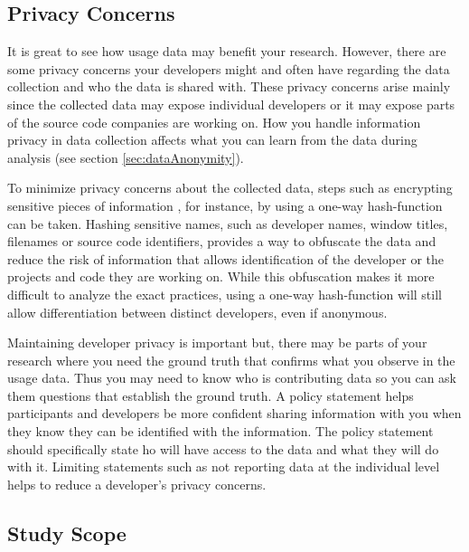 \subsection{Privacy Concerns}

It is great to see how usage data may benefit your research. However, there are some privacy concerns your developers might and often have regarding the data collection and who the data is shared with. These privacy concerns arise mainly since the collected data may expose individual developers or it may expose parts of the source code companies are working on.  How you handle information privacy in data collection affects what you can learn from the data during analysis (see section \ref{sec:dataAnonymity}).

To minimize privacy concerns about the collected data, steps such as encrypting sensitive pieces of information , for instance, by using a one-way hash-function can be taken. Hashing sensitive names, such as developer names, window titles, filenames or source code identifiers, provides a way to obfuscate the data and reduce the risk of information that allows identification of the developer or the projects and code they are working on. While this obfuscation makes it more difficult to analyze the exact practices, using a one-way hash-function will still allow differentiation between distinct developers, even if anonymous.

Maintaining developer privacy is important but, there may be parts of your research where you need the ground truth that confirms what you observe in the usage data.  Thus you may need to know who is contributing data so you can ask them questions that establish the ground truth. A policy statement helps participants and developers be more confident sharing information with you when they know they can be identified with the information.  The policy statement should specifically state ho will have access to the data and what they will do with it. Limiting statements such as not reporting data at the individual level helps to reduce a developer's privacy concerns.

\subsection{Study Scope}



